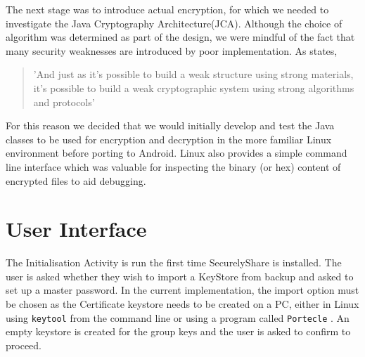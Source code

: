 The next stage was to introduce actual encryption, for which we needed to investigate the Java Cryptography Architecture(JCA).  Although the choice of algorithm was determined as part of the design, we were mindful of the fact that  many security weaknesses are introduced by poor implementation. As \citet{schneier1998security} states,
\begin{quotation}
'And just as it's possible to build a weak structure using strong materials, it's possible to build a weak cryptographic system using strong algorithms and protocols' 
\end{quotation}  
For this reason we decided that we would initially develop and test the  Java classes to be used for encryption and decryption in the more familiar Linux environment before porting to Android.  Linux also provides a simple command line interface which was valuable for inspecting the binary (or hex) content of encrypted files to aid debugging.

\section{User Interface}

The Initialisation Activity is run the first time SecurelyShare is installed.  The user is asked whether they wish to import a KeyStore from backup and asked to set up a master password.  In the current implementation, the import option must be chosen as the Certificate keystore needs to be created on a PC, either in Linux using  \texttt{keytool} from the command line or using a program called \texttt{Portecle}  \citet{portecle}.  An empty keystore is created for the group keys and the user is asked to confirm to proceed.

